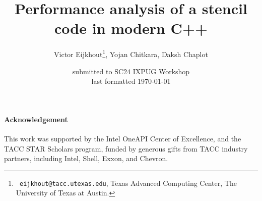 \documentclass[11pt,fleqn]{IEEEtran}
\begin{document}
\title{Performance analysis of a stencil code in modern C++}
\author{Victor Eijkhout\thanks{{\tt
      eijkhout@tacc.utexas.edu}, Texas Advanced Computing Center, The
    University of Texas at Austin.
  }, Yojan Chitkara, Daksh Chaplot}
\date{submitted to SC24 IXPUG Workshop\\ last formatted \today}
\maketitle



\paragraph*{Acknowledgement}
This work was supported by
the Intel OneAPI Center of Excellence, and the 
TACC STAR Scholars program,
funded by generous gifts from TACC industry partners, including Intel, Shell, Exxon, and Chevron.
\end{document}
